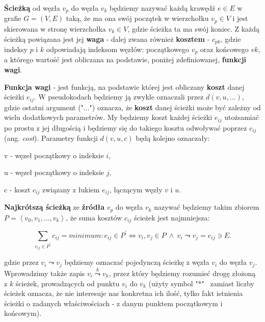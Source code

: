 \begin{myitemize}

\item \textbf{Ścieżką} od węzła $v_{p}$ do węzła $v_{k}$ będziemy nazywać każdą krawędź $e \in E$ w grafie $G = \left( V, E \right)$ taką, że ma ona swój początek w wierzchołku $v_{p} \in V$ i jest skierowana w stronę wierzchołka $v_{k} \in V$, gdzie ścieżka ta ma swój koniec. Z każdą ścieżką powiązana jest jej \textbf{waga} - dalej zwana również \textbf{kosztem} - $c_{pk}$, gdzie indeksy $p$ i $k$ odpowiadają indeksom węzłów: początkowego $v_{p}$ oraz końcowego $v{k}$, a którego wartość jest obliczana na podstawie, poniżej zdefiniowanej, \textbf{funkcji wagi}.

\item \textbf{Funkcja wagi} - jest funkcją, na podstawie której jest obliczany \textbf{koszt} danej ścieżki $e_{ij}$. W pseudokodach będziemy ją zwykle oznaczali przez $ d \left( v, u, \ldots \right) $, gdzie ostatni argument ("$\ldots$") oznacza, że \textbf{koszt} danej ścieżki może być zależny od wielu dodatkowych parametrów. My będziemy koszt każdej ścieżki $e_{ij}$ utożsamiać po prostu z jej długością i będziemy się do takiego kosztu odwoływać poprzez $c_{ij}$ (ang. \textit{cost}). Parametry funkcji $ d \left( v, u, c \right) $ będą kolejno oznaczały:

\begin{myitemize}

\item[v] - węzeł początkowy o indeksie $i$,
\item[u] - węzeł początkowy o indeksie $j$,
\item[c] - koszt $c_{ij}$ związany z łukiem $e_{ij}$, łączącym węzły $v$ i $u$.

\end{myitemize}


\item \textbf{Najkrótszą ścieżką} ze \textbf{źródła} $v_{p}$ do węzła $v_{k}$ nazywać będziemy takim zbiorem $P = \left \langle v_{0}, v_{1}, \ldots, v_{k} \right \rangle $, że suma kosztów $c_{ij}$ ścieżek jest najmniejsza:

\begin{equation}
\sum_{e_{ij} \in P^{'}} c_{ij} = minimum : e_{ij} \in P^{'} \Leftrightarrow v_{i},v_{j} \in P \: \wedge \: v_{i} \leadsto v_{j} = e_{ij} \ni E.
\end{equation}

gdzie przez $v_{i} \leadsto v_{j}$ będziemy oznaczać pojedynczą ścieżkę z węzła $v_{i}$ do węzła $v_{j}$. Wprowadzimy także zapis $v_{i} \overset{k}\leadsto v_{k}$, przez który będziemy rozumieć drogę złożoną z $k$ ścieżek, prowadzących od punktu $v_{i}$ do $v_{k}$ (użyty symbol "$*$"~ zamiast liczby ścieżek oznacza, że nie interesuje nas konkretna ich ilość, tylko fakt istnienia ścieżki o zadanych właściwościach - z danym punktem początkowym i końcowym). 


\end{myitemize}
